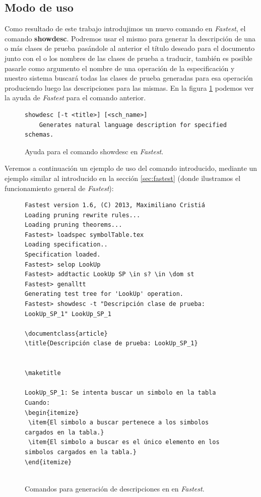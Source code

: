 \subsection{Modo de uso}

Como resultado de este trabajo introdujimos un nuevo comando en \textit{Fastest}, el comando \textbf{showdesc}. Podremos usar el mismo para generar la descripción de una o más clases de prueba pasándole al anterior el título deseado para el documento junto con el o los nombres de las clases de prueba a traducir, también es posible pasarle como argumento el nombre de una operación de la especificación y nuestro sistema buscará todas las clases de prueba generadas para esa operación produciendo luego las descripciones para las mismas. En la figura \ref{ej:showdesc_fastest} podemos ver la ayuda de \textit{Fastest} para el comando anterior.

\begin{figure}[H]
\begin{Verbatim}[frame=single,fontsize=\scriptsize]
showdesc [-t <title>] [<sch_name>]
	Generates natural language description for specified schemas.
\end{Verbatim}
\caption{Ayuda para el comando showdesc en \emph{Fastest}.}
\label{ej:showdesc_fastest}
\end{figure}

Veremos a continuación un ejemplo de uso del comando introducido, mediante un ejemplo similar al introducido en la sección \ref{sec:fastest} (donde ilustramos el funcionamiento general de \textit{Fastest}):

\begin{figure}[H]
\begin{Verbatim}[frame=single,fontsize=\scriptsize]
Fastest version 1.6, (C) 2013, Maximiliano Cristiá
Loading pruning rewrite rules...
Loading pruning theorems...
Fastest> loadspec symbolTable.tex
Loading specification..
Specification loaded.
Fastest> selop LookUp
Fastest> addtactic LookUp SP \in s? \in \dom st      
Fastest> genalltt
Generating test tree for 'LookUp' operation.
Fastest> showdesc -t "Descripción clase de prueba: LookUp_SP_1" LookUp_SP_1 

\documentclass{article}
\title{Descripción clase de prueba: LookUp_SP_1}


\maketitle

LookUp_SP_1: Se intenta buscar un simbolo en la tabla
Cuando:
\begin{itemize}
 \item{El simbolo a buscar pertenece a los simbolos cargados en la tabla.}
 \item{El simbolo a buscar es el único elemento en los simbolos cargados en la tabla.}
\end{itemize}


\end{Verbatim}
\caption{Comandos para generación de descripciones en en \emph{Fastest}.}
\label{ej:comandos_fastest_nlg}
\end{figure}

